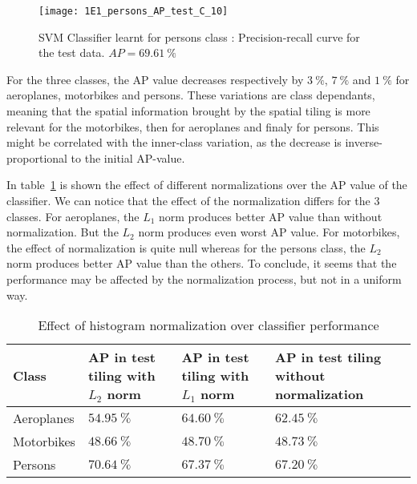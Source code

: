 \documentclass{article}
\begin{document}
\begin{figure}[ht!]
	\centering
	\texttt{[image: 1E1\_persons\_AP\_test\_C\_10]}
	\caption{SVM Classifier learnt for persons class : Precision-recall curve for the test data. \(AP = 69.61~\%\)}
	\label{fig_1E1_persons}
\end{figure}

For the three classes, the AP value decreases respectively by \(3~\%\),  \(7~\%\) and \(1~\%\) for aeroplanes, motorbikes and persons. These variations are class dependants, meaning that the spatial information brought by the spatial tiling is more relevant for the motorbikes, then for aeroplanes and finaly for persons. This might be correlated with the inner-class variation, as the decrease is inverse-proportional to the initial AP-value.

\clearpage


In table~\ref{tab_normalization} is shown the effect of different normalizations over the AP value of the classifier. We can notice that the effect of the normalization differs for the 3 classes. For aeroplanes, the \(L_1\) norm produces better AP value than without normalization. But the \(L_2\) norm produces even worst AP value. For motorbikes, the effect of normalization is quite null whereas for the persons class, the \(L_2\) norm produces better AP value than the others. To conclude, it seems that the performance may be affected by the normalization process, but not in a uniform way.

\begin{table}[ht!]
	\begin{tabular}{|l | p{3.5cm} | p{3.5cm}| p{3.5cm}|}
		\hline
		Class      & AP in test tiling with \(L_2\) norm & AP in test tiling with \(L_1\) norm & AP in test tiling without normalization \\\hline\hline
		Aeroplanes & \(54.95~\%\)                        & \(64.60~\%\)                        & \(62.45~\%\)                            \\\hline
		Motorbikes & \(48.66~\%\)                        & \(48.70~\%\)                        & \(48.73~\%\)                            \\\hline
		Persons    & \(70.64~\%\)                        & \(67.37~\%\)                        & \(67.20~\%\)                            \\\hline
	\end{tabular}
	\caption{Effect of histogram normalization over classifier performance}
	\label{tab_normalization}
\end{table}
\end{document}

